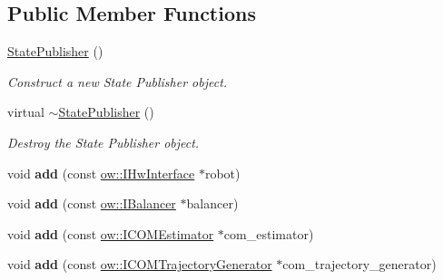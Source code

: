 \subsection*{Public Member Functions}
\begin{DoxyCompactItemize}
\item 
\hyperlink{classow__pub_1_1StatePublisher_a2adc8446a46f388902561aa93e7a3aac}{State\+Publisher} ()\hypertarget{classow__pub_1_1StatePublisher_a2adc8446a46f388902561aa93e7a3aac}{}\label{classow__pub_1_1StatePublisher_a2adc8446a46f388902561aa93e7a3aac}

\begin{DoxyCompactList}\small\item\em Construct a new State Publisher object. \end{DoxyCompactList}\item 
virtual \hyperlink{classow__pub_1_1StatePublisher_a6e55d6c5ce60976a89d41e1dcdeaffe6}{$\sim$\+State\+Publisher} ()\hypertarget{classow__pub_1_1StatePublisher_a6e55d6c5ce60976a89d41e1dcdeaffe6}{}\label{classow__pub_1_1StatePublisher_a6e55d6c5ce60976a89d41e1dcdeaffe6}

\begin{DoxyCompactList}\small\item\em Destroy the State Publisher object. \end{DoxyCompactList}\item 
void {\bfseries add} (const \hyperlink{classow_1_1IHwInterface}{ow\+::\+I\+Hw\+Interface} $\ast$robot)\hypertarget{classow__pub_1_1StatePublisher_adc9f6fbbf38cfc8c6e035859ec89befd}{}\label{classow__pub_1_1StatePublisher_adc9f6fbbf38cfc8c6e035859ec89befd}

\item 
void {\bfseries add} (const \hyperlink{classow_1_1IBalancer}{ow\+::\+I\+Balancer} $\ast$balancer)\hypertarget{classow__pub_1_1StatePublisher_a2b7631914b4bd928cd8cb5be6007cac1}{}\label{classow__pub_1_1StatePublisher_a2b7631914b4bd928cd8cb5be6007cac1}

\item 
void {\bfseries add} (const \hyperlink{classow_1_1ICOMEstimator}{ow\+::\+I\+C\+O\+M\+Estimator} $\ast$com\+\_\+estimator)\hypertarget{classow__pub_1_1StatePublisher_a6783dfd9b4a87f208f50c361990dbc4d}{}\label{classow__pub_1_1StatePublisher_a6783dfd9b4a87f208f50c361990dbc4d}

\item 
void {\bfseries add} (const \hyperlink{classow_1_1ICOMTrajectoryGenerator}{ow\+::\+I\+C\+O\+M\+Trajectory\+Generator} $\ast$com\+\_\+trajectory\+\_\+generator)\hypertarget{classow__pub_1_1StatePublisher_aabb65f57b1d48df8de600dbe6a75d6ac}{}\label{classow__pub_1_1StatePublisher_aabb65f57b1d48df8de600dbe6a75d6ac}


\end{DoxyCompactItemize}
